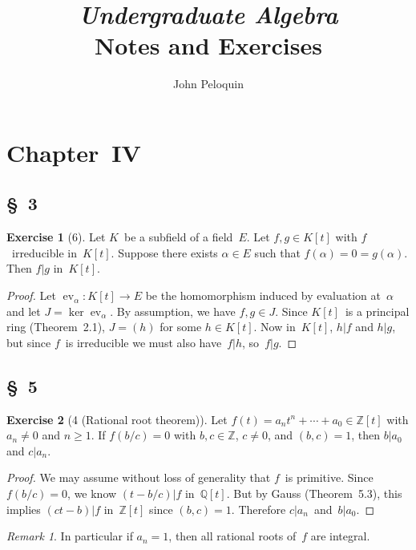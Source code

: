 \documentclass[letterpaper,12pt]{article}
\title{\textit{Undergraduate Algebra}\\Notes and Exercises}
\author{John Peloquin}
\date{}
\newcommand{\Z}{\mathbb{Z}}
\newcommand{\Q}{\mathbb{Q}}
\DeclareMathOperator{\eval}{\mathrm{ev}}
\theoremstyle{definition}
\newtheorem*{exer}{Exercise}
\theoremstyle{remark}
\newtheorem*{rmk}{Remark}
\theoremstyle{direction}
\begin{document}
\maketitle

\section*{Chapter~IV}

\subsection*{\S~3}
\begin{exer}[6]
Let \(K\)~be a subfield of a field~\(E\). Let \(f,g\in K[t]\) with \(f\)~irreducible in~\(K[t]\). Suppose there exists \(\alpha\in E\) such that \(f(\alpha)=0=g(\alpha)\). Then \(f|g\) in~\(K[t]\).
\end{exer}
\begin{proof}
Let \(\eval_{\alpha}:K[t]\to E\) be the homomorphism induced by evaluation at~\(\alpha\) and let \(J=\ker\eval_{\alpha}\). By assumption, we have \(f,g\in J\). Since \(K[t]\)~is a principal ring (Theorem~2.1), \(J=(h)\) for some \(h\in K[t]\). Now in~\(K[t]\), \(h|f\) and \(h|g\), but since \(f\)~is irreducible we must also have~\(f|h\), so~\(f|g\).
\end{proof}

\subsection*{\S~5}
\begin{exer}[4 (Rational root theorem)]
Let \(f(t)=a_nt^n+\cdots+a_0\in\Z[t]\) with \(a_n\ne0\) and \(n\ge1\). If \(f(b/c)=0\) with \(b,c\in\Z\), \(c\ne0\), and \((b,c)=1\), then \(b|a_0\) and \(c|a_n\).
\end{exer}
\begin{proof}
We may assume without loss of generality that \(f\)~is primitive. Since \(f(b/c)=0\), we know \((t-b/c)|f\) in~\(\Q[t]\). But by Gauss (Theorem~5.3), this implies \((ct-b)|f\) in~\(\Z[t]\) since \((b,c)=1\). Therefore \(c|a_n\)~and~\(b|a_0\).
\end{proof}
\begin{rmk}
In particular if \(a_n=1\), then all rational roots of~\(f\) are integral.
\end{rmk}
\end{document}
